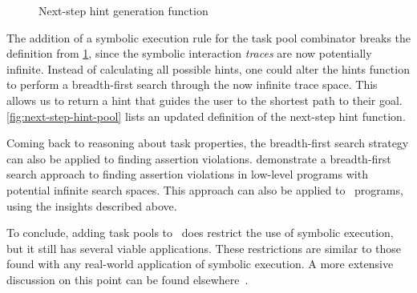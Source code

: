 \begin{figure}
  \begin{mathpar}
  \end{mathpar}
  \caption{Next-step hint generation function}
  \label{fig:next-step-hint}
\end{figure}


The addition of a symbolic execution rule for the task pool combinator breaks the definition from \cref{fig:next-step-hint}, since the symbolic interaction \textit{traces} are now potentially infinite.
Instead of calculating all possible hints, one could alter the hints function to perform a breadth-first search through the now infinite trace space.
This allows us to return a hint that guides the user to the shortest path to their goal.
\cref{fig:next-step-hint-pool} lists an updated definition of the next-step hint function.

\begin{figure*}
  \begin{mathpar}
  \end{mathpar}
  \caption{Next-step hint generation function}
  \label{fig:next-step-hint}
\end{figure*}


Coming back to reasoning about task properties, the breadth-first search strategy can also be applied to finding assertion violations.
\citet{DBLP:conf/tap/NausVSR23} demonstrate a breadth-first search approach to finding assertion violations in low-level programs with potential infinite search spaces.
This approach can also be applied to \DYNTOPHAT\ programs, using the insights described above.

To conclude, adding task pools to \TOPHAT\ does restrict the use of symbolic execution, but it still has several viable applications.
These restrictions are similar to those found with any real-world application of symbolic execution.
A more extensive discussion on this point can be found elsewhere~\cite{conf/ifl/NausSK19}.